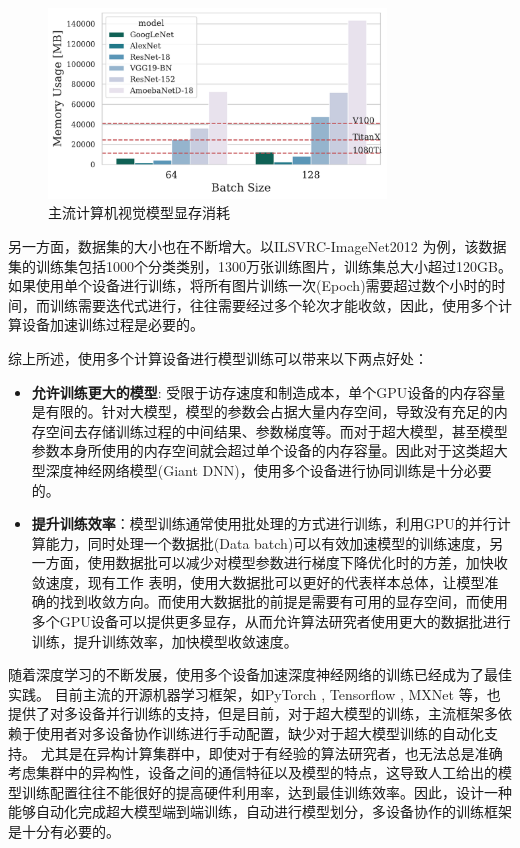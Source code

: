 \begin{figure}[h]
    \centering
    \includegraphics[width=0.8\textwidth]{figure/1-intro/model_mem.pdf}
    \caption{主流计算机视觉模型显存消耗}
    \label{fig:model-mem}
\end{figure}

另一方面，数据集的大小也在不断增大。以ILSVRC-ImageNet2012  为例，该数据集的训练集包括1000个分类类别，1300万张训练图片，训练集总大小超过120GB。如果使用单个设备进行训练，将所有图片训练一次(Epoch)需要超过数个小时的时间，而训练需要迭代式进行，往往需要经过多个轮次才能收敛，因此，使用多个计算设备加速训练过程是必要的。

综上所述，使用多个计算设备进行模型训练可以带来以下两点好处：
\begin{itemize}
	\item \textbf{允许训练更大的模型}: 受限于访存速度和制造成本，单个GPU设备的内存容量是有限的。针对大模型，模型的参数会占据大量内存空间，导致没有充足的内存空间去存储训练过程的中间结果、参数梯度等。而对于超大模型，甚至模型参数本身所使用的内存空间就会超过单个设备的内存容量。因此对于这类超大型深度神经网络模型(Giant DNN)，使用多个设备进行协同训练是十分必要的。
	\item \textbf{提升训练效率}：模型训练通常使用批处理的方式进行训练，利用GPU的并行计算能力，同时处理一个数据批(Data batch)可以有效加速模型的训练速度，另一方面，使用数据批可以减少对模型参数进行梯度下降优化时的方差，加快收敛速度，现有工作  表明，使用大数据批可以更好的代表样本总体，让模型准确的找到收敛方向。而使用大数据批的前提是需要有可用的显存空间，而使用多个GPU设备可以提供更多显存，从而允许算法研究者使用更大的数据批进行训练，提升训练效率，加快模型收敛速度。
\end{itemize}

随着深度学习的不断发展，使用多个设备加速深度神经网络的训练已经成为了最佳实践。
目前主流的开源机器学习框架，如PyTorch  , Tensorflow , MXNet 等，也提供了对多设备并行训练的支持，但是目前，对于超大模型的训练，主流框架多依赖于使用者对多设备协作训练进行手动配置，缺少对于超大模型训练的自动化支持。
尤其是在异构计算集群中，即使对于有经验的算法研究者，也无法总是准确考虑集群中的异构性，设备之间的通信特征以及模型的特点，这导致人工给出的模型训练配置往往不能很好的提高硬件利用率，达到最佳训练效率。因此，设计一种能够自动化完成超大模型端到端训练，自动进行模型划分，多设备协作的训练框架是十分有必要的。


